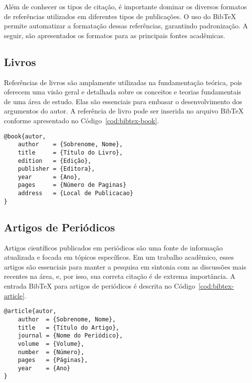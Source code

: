\documentclass[
    12pt
    ,oneside
    ,a4paper
    ,chapter=TITLE
    ,section=TITLE
    ,sumario=abnt-6027-2012]{abntex2}
\begin{document}
Além de conhecer os tipos de citação, é importante dominar os diversos formatos de referências utilizados em diferentes tipos de publicações. O uso do BibTeX permite automatizar a formatação dessas referências, garantindo padronização. A seguir, são apresentados os formatos para as principais fontes acadêmicas.

\subsection{Livros}

Referências de livros são amplamente utilizadas na fundamentação teórica, pois oferecem uma visão geral e detalhada sobre os conceitos e teorias fundamentais de uma área de estudo. Elas são essenciais para embasar o desenvolvimento dos argumentos do autor. A referência de livro pode ser inserida no arquivo BibTeX conforme apresentado no Código~\ref{cod:bibtex-book}.

\begin{codigo}[htb]
\begin{lstlisting}
@book{autor,
    author    = {Sobrenome, Nome},
    title     = {Título do Livro},
    edition   = {Edição},
    publisher = {Editora},
    year      = {Ano},
    pages     = {Número de Paginas}
    address   = {Local de Publicacao}
}
\end{lstlisting}
\fonteautor
\end{codigo}

\subsection{Artigos de Periódicos}

Artigos científicos publicados em periódicos são uma fonte de informação atualizada e focada em tópicos específicos. Em um trabalho acadêmico, esses artigos são essenciais para manter a pesquisa em sintonia com as discussões mais recentes na área, e, por isso, sua correta citação é de extrema importância. A entrada BibTeX para artigos de periódicos é descrita no Código~\ref{cod:bibtex-article}.

\begin{codigo}[htb]
\begin{lstlisting}
@article{autor,
    author  = {Sobrenome, Nome},
    title   = {Título do Artigo},
    journal = {Nome do Periódico},
    volume  = {Volume},
    number  = {Número},
    pages   = {Páginas},
    year    = {Ano}
}
\end{lstlisting}
\fonteautor
\end{codigo}
\end{document}
